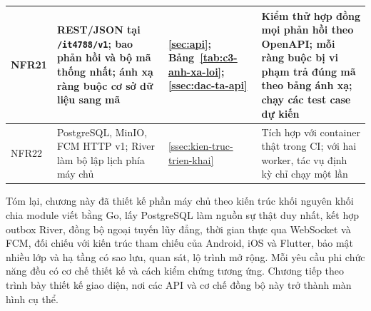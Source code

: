 {\begin{longtable}{|L{1.35cm}|L{5.3cm}|L{2.3cm}|L{\dimexpr{}\arrayrulewidth-8.95cm\relax}|}
NFR21 & REST/JSON tại \texttt{/it4788/v1}; bao phản hồi và bộ mã thống nhất; ánh xạ ràng buộc cơ sở dữ liệu sang mã & \ref{sec:api}; Bảng~\ref{tab:c3-anh-xa-loi}; \ref{ssec:dac-ta-api} & Kiểm thử hợp đồng mọi phản hồi theo OpenAPI; mỗi ràng buộc bị vi phạm trả đúng mã theo bảng ánh xạ; chạy các test case dự kiến\\ \hline
NFR22 & PostgreSQL, MinIO, FCM HTTP v1; River làm bộ lập lịch phía máy chủ & \ref{ssec:kien-truc-trien-khai} & Tích hợp với container thật trong CI; với hai worker, tác vụ định kỳ chỉ chạy một lần\\ \hline
\end{longtable}
}

Tóm lại, chương này đã thiết kế phần máy chủ theo kiến trúc khối nguyên khối chia module viết bằng Go, lấy PostgreSQL làm nguồn sự thật duy nhất, kết hợp outbox River, đồng bộ ngoại tuyến lũy đẳng, thời gian thực qua WebSocket và FCM, đối chiếu với kiến trúc tham chiếu của Android, iOS và Flutter, bảo mật nhiều lớp và hạ tầng có sao lưu, quan sát, lộ trình mở rộng. Mỗi yêu cầu phi chức năng đều có cơ chế thiết kế và cách kiểm chứng tương ứng. Chương tiếp theo trình bày thiết kế giao diện, nơi các API và cơ chế đồng bộ này trở thành màn hình cụ thể.
